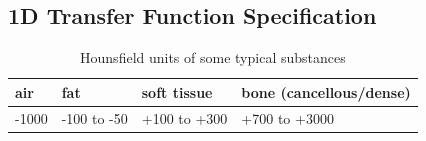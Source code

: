 \documentclass{egpubl}
\begin{document}
\subsection{1D Transfer Function Specification}



\begin{table}
	\centering
	\normalsize
	\begin{tabular}{llll}
		\hline
		air & fat & soft tissue & bone (cancellous/dense)\\
		\hline
		-1000 & -100 to -50 & +100 to +300 & +700 to +3000\\
		\hline
	\end{tabular}
	\caption{Hounsfield units of some typical substances \cite{feeman_mathematics_2009}}
	\label{table:Hounsfield_unit}
\end{table}
\end{document}
